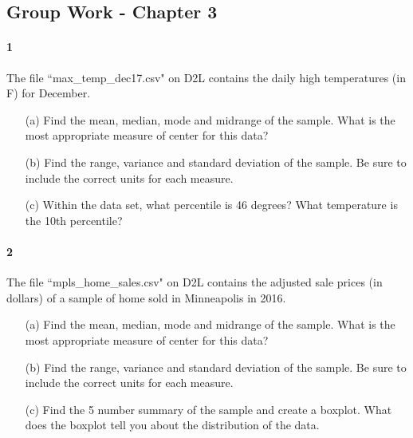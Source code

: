 \documentclass{article}
\begin{document}
\begin{flushleft}
\section*{Group Work - Chapter 3}
\paragraph{1} The file ``max\_temp\_dec17.csv" on D2L contains the daily high temperatures (in F) for December. 
\begin{itemize}
\item [(a)] Find the mean, median, mode and midrange of the sample. What is the most appropriate measure of center for this data?
\vspace{2.25in}
\item[(b)] Find the range, variance and standard deviation of the sample. Be sure to include the correct units for each measure.

\vspace{2.25in}
\item[(c)] Within the data set, what percentile is 46 degrees? What temperature is the 10th percentile?
\end{itemize}



\newpage
\paragraph{2} The file ``mpls\_home\_sales.csv" on D2L contains the adjusted sale prices (in dollars) of a sample of home sold in Minneapolis in 2016. 
\begin{itemize}
\item [(a)] Find the mean, median, mode and midrange of the sample. What is the most appropriate measure of center for this data?
\vspace{2.25in}
\item[(b)] Find the range, variance and standard deviation of the sample. Be sure to include the correct units for each measure.
\vspace{2.25in}
\item[(c)] Find the 5 number summary of the sample and create a boxplot. What does the boxplot tell you about the distribution of the data.
\end{itemize}

\newpage

\end{flushleft}
\end{document}

